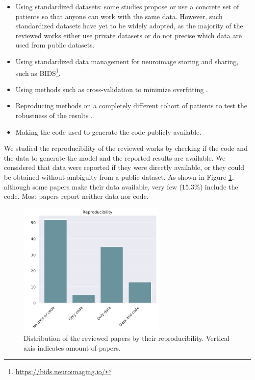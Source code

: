 \begin{itemize}\itemsep7pt
\item Using standardized datasets: some studies \cite{cuingnet,Moradi2015,Sanroma2017,Wyman2013} propose or use a concrete set of patients so that anyone can work with the same data. However, such standardized datasets have yet to be widely adopted, as the majority of the reviewed works either use private datasets or do not precise which data are used from public datasets.

\item Using standardized data management for neuroimage storing and sharing, such as BIDS\footnote{\url{https://bids.neuroimaging.io/}}. 

\item Using methods such as cross-validation to minimize overfitting \cite{Yang2018}.

\item Reproducing methods on a completely different cohort of patients to test the robustness of the results \cite{Casanova2018}.

\item Making the code used to generate the code publicly available.
\end{itemize}

We studied the reproducibility of the reviewed works by checking if the code and the data to generate the model and the reported results are available. We considered that data were reported if they were directly available, or they could be obtained without ambiguity from a public dataset. As shown in Figure \ref{fig:reproduc}, although some papers make their data available, very few ($15.3 \%$) include the code. Most papers report neither data nor code.  \\

\begin{figure}[!htbp]
\centering
\includegraphics[width=0.65\textwidth]{figures/review/Fig10.pdf}
    \caption[Distribution of the reviewed papers by their reproducibility.]{Distribution of the reviewed papers by their reproducibility. Vertical axis indicates amount of papers.}
    \label{fig:reproduc}
\end{figure}

